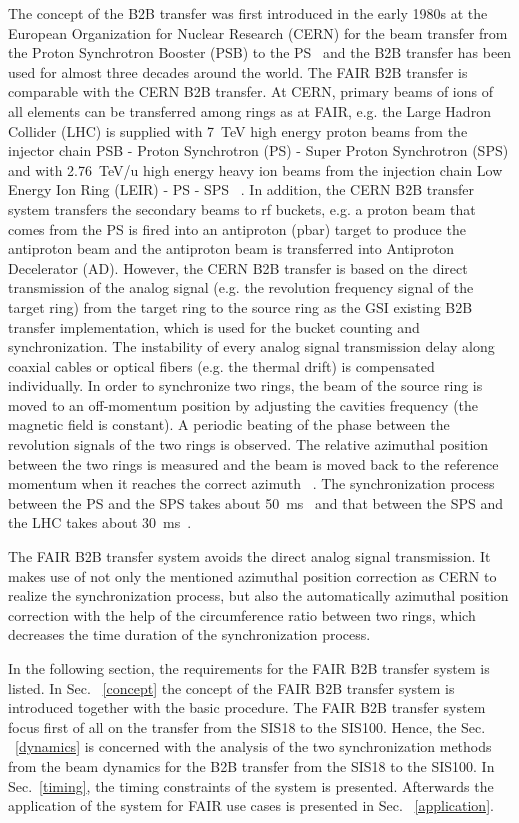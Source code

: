 The concept of the B2B transfer was first introduced in the early 1980s at the European Organization for Nuclear Research (CERN) for the beam transfer from the Proton Synchrotron Booster (PSB) to the PS~\cite{garoby_cern-ps-rf-note-84-6_1984} and the B2B transfer has been used for almost three decades around the world. The FAIR B2B transfer is comparable with the CERN B2B transfer. At CERN, primary beams of ions of all elements can be transferred among rings as at FAIR, e.g. the Large Hadron Collider (LHC) is supplied with \SI{7}{TeV} high energy proton beams from the injector chain PSB - Proton Synchrotron (PS) -  Super Proton Synchrotron (SPS) and with \SI{2.76}{TeV/u} high energy heavy ion beams from the injection chain Low Energy Ion Ring (LEIR) - PS - SPS  ~\cite{noauthor_cern_nodate}. In addition, the CERN B2B transfer system transfers the secondary beams to rf buckets, e.g. a proton beam that comes from the PS is fired into an antiproton (pbar) target to produce the antiproton beam and the antiproton beam is transferred into Antiproton Decelerator (AD). However, the CERN B2B transfer is based on the direct transmission of the analog signal (e.g. the revolution frequency signal of the target ring) from the target ring to the source ring as the GSI existing B2B transfer implementation, which is used for the bucket counting and synchronization. The instability of every analog signal transmission delay along coaxial cables or optical fibers (e.g. the thermal drift) is compensated individually. In order to synchronize two rings, the beam of the source ring is moved to an off-momentum position by adjusting the cavities frequency (the magnetic field is constant). A periodic beating of the phase between the revolution signals of the two rings is observed. The relative azimuthal position between the two rings is measured and the beam is moved back to the reference momentum when it reaches the correct azimuth ~\cite{damerau_lecture_2017}. The synchronization process between the PS and the SPS takes about \SI{50}{\ms}~\cite{ferrand_cern-acc-note-2015-0025_2015} and that between the SPS and the LHC takes about \SI{30}{\ms}~\cite{baudrenghien_sps_1998}. 

The FAIR B2B transfer system avoids the direct analog signal transmission. It makes use of not only the mentioned azimuthal position correction as CERN to realize the synchronization process, but also the automatically azimuthal position correction with the help of the circumference ratio between two rings, which decreases the time duration of the synchronization process.   

In the following section, the requirements for the FAIR B2B transfer system is listed. In Sec. ~\ref{concept} the concept of the FAIR B2B transfer system is introduced together with the basic procedure. The FAIR B2B transfer system focus first of all on the transfer from the SIS18 to the SIS100. Hence, the Sec. ~\ref{dynamics} is concerned with the analysis of the two synchronization methods from the beam dynamics for the B2B transfer from the SIS18 to the SIS100. In Sec.~\ref{timing}, the timing constraints of the system is presented. Afterwards the application of the system for FAIR use cases is presented in Sec. ~\ref{application}.


